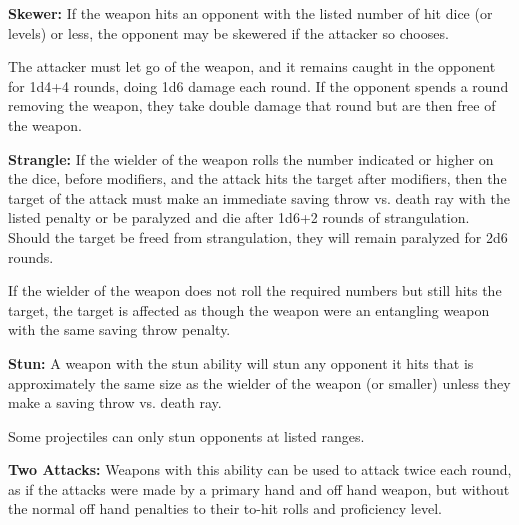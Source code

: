 \begin{multicols*}{2}
\textbf{Skewer:} If the weapon hits an opponent with the listed number of hit dice (or levels) or less, the opponent may be skewered if the attacker so chooses.

The attacker must let go of the weapon, and it remains caught in the opponent for 1d4+4 rounds, doing 1d6 damage each round. If the opponent spends a round removing the weapon, they take double damage that round but are then free of the weapon.

\textbf{Strangle:} If the wielder of the weapon rolls the number indicated or higher on the dice, before modifiers, and the attack hits the target after modifiers, then the target of the attack must make an immediate saving throw vs. death ray with the listed penalty or be paralyzed and die after 1d6+2 rounds of strangulation. Should the target be freed from strangulation, they will remain paralyzed for 2d6 rounds.

If the wielder of the weapon does not roll the required numbers but still hits the target, the target is affected as though the weapon were an entangling weapon with the same saving throw penalty.

\textbf{Stun:} A weapon with the stun ability will stun any opponent it hits that is approximately the same size as the wielder of the weapon (or smaller) unless they make a saving throw vs. death ray.

Some projectiles can only stun opponents at listed ranges.

\textbf{Two Attacks:} Weapons with this ability can be used to attack twice each round, as if the attacks were made by a primary hand and off hand weapon, but without the normal off hand penalties to their to-hit rolls and proficiency level.
\end{multicols*}

